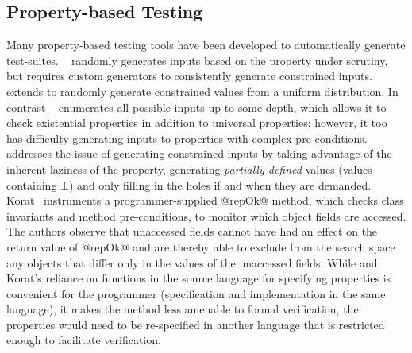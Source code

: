 \subsection{Property-based Testing}
\label{sec:property-based-testing}
Many property-based testing tools have been developed to automatically generate
test-suites. \quickcheck~\cite{claessen_quickcheck:_2000} randomly generates
inputs based on the property under scrutiny, but requires custom generators to
consistently generate constrained inputs. \cite{Claessen14Flops} extends
\quickcheck to randomly generate constrained values from a uniform distribution.
%
In contrast \smallcheck~\cite{runciman_smallcheck_2008} enumerates all possible
inputs up to some depth, which allows it to check existential properties in
addition to universal properties; however, it too has difficulty generating
inputs to properties with complex pre-conditions.
%
\lazysmallcheck~\cite{runciman_smallcheck_2008} addresses the issue of generating
constrained inputs by taking advantage of the inherent laziness of the
property, generating \emph{partially-defined} values (\ie values
containing $\bot$) and only filling in the holes if and when they are
demanded. 
%
Korat~\cite{Boyapati02} instruments a programmer-supplied
@repOk@ method, which checks class invariants and method pre-conditions, to
monitor which object fields are accessed. The authors observe that unaccessed fields
cannot have had an effect on the return value of @repOk@ and are thereby able to
exclude from the search space any objects that differ only in the values of the
unaccessed fields. 
%
While \lazysmallcheck and Korat's reliance on functions in the 
source language for specifying properties is convenient for the 
programmer (specification and implementation in the same language), 
it makes the method less amenable to formal verification, the
properties would need to be re-specified in another language 
that is restricted enough to facilitate verification.

